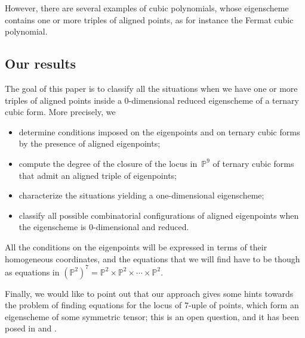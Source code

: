\documentclass[a4paper, 11pt, reqno]{amsart}
\theoremstyle{plain}
\theoremstyle{definition}
\newcommand{\p}{\mathbb{P}}
\begin{document}
However, there are several examples of cubic polynomials, whose eigenscheme contains one or more triples of aligned points, as for instance the Fermat cubic polynomial.

\subsection*{Our results}
The goal of this paper is to classify all the situations when we have one or more triples of aligned points inside a $0$-dimensional reduced eigenscheme of a ternary cubic form.
More precisely, we
%
\begin{itemize}
    \item determine conditions imposed on the eigenpoints and on ternary cubic forms by the presence of aligned eigenpoints;
    \item compute the degree of the closure of the locus in~$\p^9$ of ternary cubic forms that admit an aligned triple of eigenpoints;
    \item characterize the situations yielding a one-dimensional eigenscheme;
    \item classify all possible combinatorial configurations of aligned eigenpoints when the eigenscheme is $0$-dimensional and reduced.
\end{itemize}
%
All the conditions on the eigenpoints will be expressed in terms of their homogeneous coordinates, and the equations that we will find have to be though as equations in $(\p^2)^7=\p^2 \times \p^2 \times \dotsb \times \p^2$.

Finally, we would like to point out that our approach gives some hints towards the problem of finding equations for the locus of $7$-uple of points, which form an eigenscheme of some symmetric tensor; this is an open question, and it has been posed in \cite{ASS} and \cite{Ottaviani24}.
\end{document}
